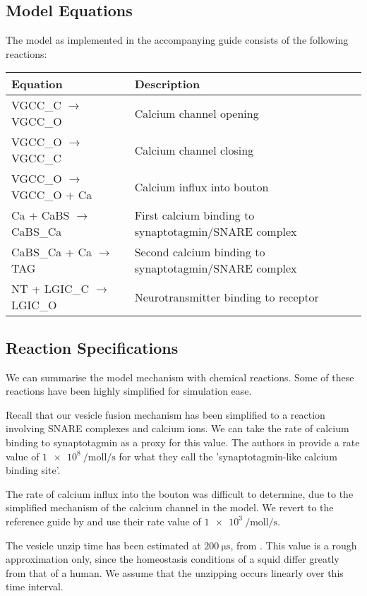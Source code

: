 \documentclass[a4paper]{article}
\begin{document}
\subsection{Model Equations}
The model as implemented in the accompanying guide consists of the following reactions:
\begin{table}[H]
\begin{tabular}{ll}
Equation & Description \\ \hline
VGCC\_C $\to$ VGCC\_O & Calcium channel opening \\
VGCC\_O $\to$ VGCC\_C & Calcium channel closing \\
VGCC\_O $\to$ VGCC\_O + Ca & Calcium influx into bouton \\
Ca + CaBS $\to$ CaBS\_Ca & First calcium binding to synaptotagmin/SNARE complex  \\ 
CaBS\_Ca + Ca $\to$ TAG & Second calcium binding to synaptotagmin/SNARE complex  \\
NT + LGIC\_C $\to$ LGIC\_O& Neurotransmitter binding to receptor \\
\end{tabular} 
\end{table}


\subsection{Reaction Specifications}
We can summarise the model mechanism with chemical reactions. Some of these reactions have been highly simplified for simulation ease.

Recall that our vesicle fusion mechanism has been simplified to a reaction involving SNARE complexes and calcium ions. We can take the rate of calcium binding to synaptotagmin as a proxy for this value. The authors in \cite{ma2014quantitative} provide a rate value of $\SI{1e8}{\per\mol\litre\per\second}$ for what they call the 'synaptotagmin-like calcium binding site'. 

The rate of calcium influx into the bouton was difficult to determine, due to the simplified mechanism of the calcium channel in the model. We revert to the reference guide by \cite{Czech:MethodsMolBiol:2009} and use their rate value of $\SI{1e3}{\per\mole\litre\per\second}$.

The vesicle unzip time has been estimated at $\SI{200}{\micro\second}$, from \cite{Llinas:TheSquidGiantSynapseAModel:1999}. This value is a rough approximation only, since the homeostasis conditions of a squid differ greatly from that of a human. We assume that the unzipping occurs linearly over this time interval.
\end{document}
